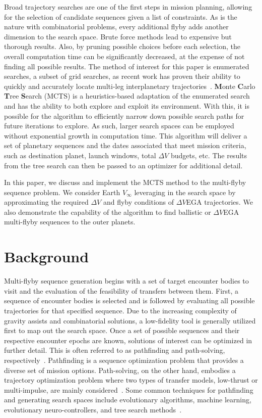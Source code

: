 \documentclass[letterpaper, preprint, paper,11pt]{AAS}	%
\begin{document}
Broad trajectory searches are one of the first steps in mission planning, allowing for the selection of candidate sequences given a list of constraints. As is the nature with combinatorial problems, every additional flyby adds another dimension to the search space. Brute force methods lead to expensive but thorough results. Also, by pruning possible choices before each selection, the overall computation time can be significantly decreased, at the expense of not finding all possible results. The method of interest for this paper is enumerated searches, a subset of grid searches, as recent work has proven their ability to quickly and accurately locate multi-leg interplanetary trajectories~\cite{Hennes2015}. \textbf{M}onte \textbf{C}arlo \textbf{T}ree \textbf{S}earch (MCTS) is a heuristics-based adaptation of the enumerated search and has the ability to both explore and exploit its environment. With this, it is possible for the algorithm to efficiently narrow down possible search paths for future iterations to explore. As such, larger search spaces can be employed without exponential growth in computation time. This algorithm will deliver a set of planetary sequences and the dates associated that meet mission criteria, such as destination planet, launch windows, total $\Delta V$ budgets, etc. The results from the tree search can then be passed to an optimizer for additional detail.

In this paper, we discuss and implement the MCTS method to the multi-flyby sequence problem. We consider Earth $V_\infty$ leveraging in the search space by approximating the required $\Delta V$ and flyby conditions of $\Delta V$EGA trajectories. We also demonstrate the capability of the algorithm to find ballistic or $\Delta V$EGA multi-flyby sequences to the outer planets.

\section*{Background}

Multi-flyby sequence generation begins with a set of target encounter bodies to visit and the evaluation of the feasibility of transfers between them. First, a sequence of encounter bodies is selected and is followed by evaluating all possible trajectories for that specified sequence. Due to the increasing complexity of gravity assists and combinatorial solutions, a low-fidelity tool is generally utilized first to map out the search space. Once a set of possible sequences and their respective encounter epochs are known, solutions of interest can be optimized in further detail. This is often referred to as pathfinding and path-solving, respectively~\cite{Hughes2016}. Pathfinding is a sequence optimization problem that provides a diverse set of mission options. Path-solving, on the other hand, embodies a trajectory optimization problem where two types of transfer models, low-thrust or multi-impulse, are mainly considered~\cite{Li2019}. Some common techniques for pathfinding and generating search spaces include evolutionary algorithms, machine learning, evolutionary neuro-controllers, and tree search methods~\cite{Izzo2019}.
\end{document}
